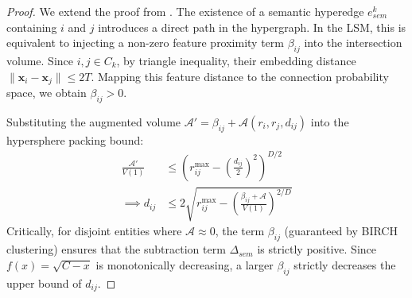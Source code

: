 \begin{proof}
    We extend the proof from \cite{mao2024revisiting}. The existence of a semantic hyperedge $e_{sem}^k$ containing $i$ and $j$ introduces a direct path in the hypergraph.
    In the LSM, this is equivalent to injecting a non-zero feature proximity term $\beta_{ij}$ into the intersection volume.
    Since $i, j \in C_k$, by triangle inequality, their embedding distance $\|\mathbf{x}_i - \mathbf{x}_j\| \le 2T$.
    Mapping this feature distance to the connection probability space, we obtain $\beta_{ij} > 0$.
    
    Substituting the augmented volume $\mathcal{A}' = \beta_{ij} + \mathcal{A}(r_i, r_j, d_{ij})$ into the hypersphere packing bound:
    \begin{equation}
    \begin{aligned}
        \frac{\mathcal{A}'}{V(1)} & \le \left(r_{ij}^{\max} - \left(\frac{d_{ij}}{2}\right)^2\right)^{D/2} \\
        \implies d_{ij} & \le 2\sqrt{r_{ij}^{\max} - \left(\frac{\beta_{ij} + \mathcal{A}}{V(1)}\right)^{2/D}}
    \end{aligned}
    \end{equation}
    Critically, for disjoint entities where $\mathcal{A} \approx 0$, the term $\beta_{ij}$ (guaranteed by BIRCH clustering) ensures that the subtraction term $\Delta_{sem}$ is strictly positive.
    Since $f(x) = \sqrt{C - x}$ is monotonically decreasing, a larger $\beta_{ij}$ strictly decreases the upper bound of $d_{ij}$.
\end{proof}

